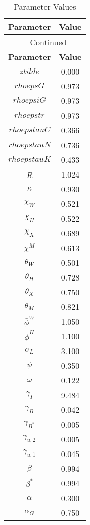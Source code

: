 \begin{center}
\begin{longtable}{cc}
\caption{Parameter Values}\\%
\toprule%
\multicolumn{1}{c}{\textbf{Parameter}} &
\multicolumn{1}{c}{\textbf{Value}}  \\%
\midrule%
\endfirsthead
\multicolumn{2}{c}{{\tablename} \thetable{} -- Continued}\\%
\midrule%
\multicolumn{1}{c}{\textbf{Parameter}} &
\multicolumn{1}{c}{\textbf{Value}} \\%
\midrule%
\endhead
$ztilde$ 	 & 	 0.000 \\
$rhoepsG$ 	 & 	 0.973 \\
$rhoepsiG$ 	 & 	 0.973 \\
$rhoepstr$ 	 & 	 0.973 \\
$rhoepstauC$ 	 & 	 0.366 \\
$rhoepstauN$ 	 & 	 0.736 \\
$rhoepstauK$ 	 & 	 0.433 \\
$\bar{R}$ 	 & 	 1.024 \\
$\kappa$ 	 & 	 0.930 \\
$\chi_W$ 	 & 	 0.521 \\
$\chi_H$ 	 & 	 0.522 \\
$\chi_X$ 	 & 	 0.689 \\
$\chi^M$ 	 & 	 0.613 \\
$\theta_W$ 	 & 	 0.501 \\
$\theta_H$ 	 & 	 0.728 \\
$\theta_X$ 	 & 	 0.750 \\
$\theta_M$ 	 & 	 0.821 \\
$\bar{\phi}^W$ 	 & 	 1.050 \\
$\bar{\phi}^H$ 	 & 	 1.100 \\
$\sigma_L$ 	 & 	 3.100 \\
$\psi$ 	 & 	 0.350 \\
$\omega$ 	 & 	 0.122 \\
$\gamma_I$ 	 & 	 9.484 \\
$\gamma_{B}$ 	 & 	 0.042 \\
$\gamma_{B^*}$ 	 & 	 0.005 \\
$\gamma_{u,2}$ 	 & 	 0.005 \\
$\gamma_{u,1}$ 	 & 	 0.045 \\
$\beta$ 	 & 	 0.994 \\
$\beta^*$ 	 & 	 0.994 \\
$\alpha$ 	 & 	 0.300 \\
$\alpha_G$ 	 & 	 0.750 \\

\end{longtable}
\end{center}
